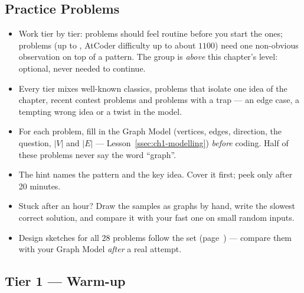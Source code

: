 \subsection{Practice Problems}
\label{ssec:ch1-problem-set}

\begin{insightbox}
\begin{itemize}[leftmargin=*]
    \item Work tier by tier: \exeasy{} problems should feel routine before you start the \exmedium{} ones; \exhard{} problems (up to , AtCoder difficulty up to about $1100$) need one non-obvious observation on top of a pattern. The \exstretch{} group is \emph{above} this chapter's level: optional, never needed to continue.
    \item Every tier mixes well-known classics, problems that isolate one idea of the chapter, recent contest problems and problems with a trap --- an edge case, a tempting wrong idea or a twist in the model.
    \item For each problem, fill in the Graph Model (vertices, edges, direction, the question, $|V|$ and $|E|$ --- Lesson~\ref{ssec:ch1-modelling}) \emph{before} coding. Half of these problems never say the word ``graph''.
    \item The hint names the pattern and the key idea. Cover it first; peek only after 20 minutes.
    \item Stuck after an hour? Draw the samples as graphs by hand, write the slowest correct solution, and compare it with your fast one on small random inputs.
    \item Design sketches for all 28 problems follow the set (page~\pageref{ssec:ch1-sketches}) --- compare them with your Graph Model \emph{after} a real attempt.
\end{itemize}
\end{insightbox}

\subsection*{Tier 1 --- Warm-up \exeasy}

